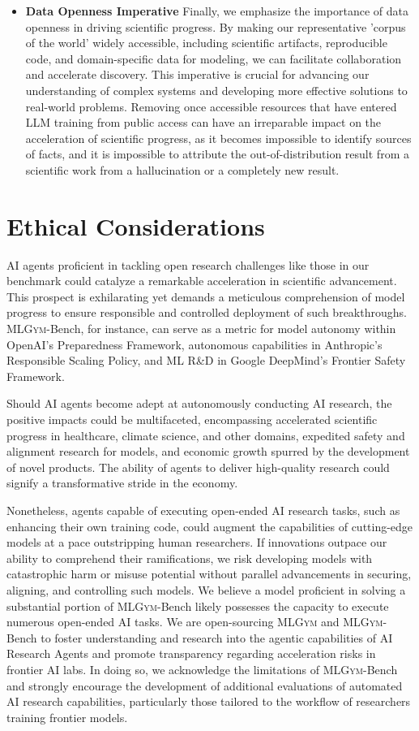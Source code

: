 \documentclass[]{fairmeta}
\newcommand{\mlgym}{\fontfamily{lmr}\selectfont\mdseries\textsc{MLGym}\xspace}
\begin{document}
\begin{itemize}
\item \textbf{Data Openness Imperative}
Finally, we emphasize the importance of data openness in driving scientific progress. By making our representative 'corpus of the world' widely accessible, including scientific artifacts, reproducible code, and domain-specific data for modeling, we can facilitate collaboration and accelerate discovery. This imperative is crucial for advancing our understanding of complex systems and developing more effective solutions to real-world problems. Removing once accessible resources that have entered LLM training from public access can have an irreparable impact on the acceleration of scientific progress, as it becomes impossible to identify sources of facts, and it is impossible to attribute the out-of-distribution result from a scientific work from a hallucination or a completely new result.
\end{itemize}

\section{Ethical Considerations}
\label{sec:ethics}

AI agents proficient in tackling open research challenges like those in our benchmark could catalyze a remarkable acceleration in scientific advancement. This prospect is exhilarating yet demands a meticulous comprehension of model progress to ensure responsible and controlled deployment of such breakthroughs. \mlgym-Bench, for instance, can serve as a metric for model autonomy within OpenAI's Preparedness Framework, autonomous capabilities in Anthropic's Responsible Scaling Policy, and ML R\&D in Google DeepMind's Frontier Safety Framework.

Should AI agents become adept at autonomously conducting AI research, the positive impacts could be multifaceted, encompassing accelerated scientific progress in healthcare, climate science, and other domains, expedited safety and alignment research for models, and economic growth spurred by the development of novel products. The ability of agents to deliver high-quality research could signify a transformative stride in the economy.

Nonetheless, agents capable of executing open-ended AI research tasks, such as enhancing their own training code, could augment the capabilities of cutting-edge models at a pace outstripping human researchers. If innovations outpace our ability to comprehend their ramifications, we risk developing models with catastrophic harm or misuse potential without parallel advancements in securing, aligning, and controlling such models. We believe a model proficient in solving a substantial portion of \mlgym-Bench likely possesses the capacity to execute numerous open-ended AI tasks. We are open-sourcing \mlgym and \mlgym-Bench to foster understanding and research into the agentic capabilities of AI Research Agents and promote transparency regarding acceleration risks in frontier AI labs. In doing so, we acknowledge the limitations of \mlgym-Bench and strongly encourage the development of additional evaluations of automated AI research capabilities, particularly those tailored to the workflow of researchers training frontier models.
\end{document}
